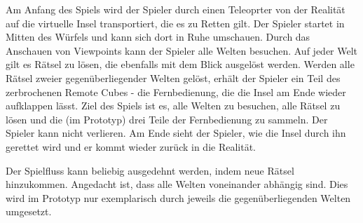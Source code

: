 
Am Anfang des Spiels wird der Spieler durch einen Teleoprter von der Realität auf die virtuelle Insel transportiert, die es zu Retten gilt. Der Spieler startet in Mitten des Würfels und kann sich dort in Ruhe umschauen. Durch das Anschauen von Viewpoints kann der Spieler alle Welten besuchen. Auf jeder Welt gilt es Rätsel zu lösen, die ebenfalls mit dem Blick ausgelöst werden. Werden alle Rätsel zweier gegenüberliegender Welten gelöst, erhält der Spieler ein Teil des zerbrochenen Remote Cubes - die Fernbedienung, die die Insel am Ende wieder aufklappen lässt.
Ziel des Spiels ist es, alle Welten zu besuchen, alle Rätsel zu lösen und die (im Prototyp) drei Teile der Fernbedienung zu sammeln. 
Der Spieler kann nicht verlieren. Am Ende sieht der Spieler, wie die Insel durch ihn gerettet wird und er kommt wieder zurück in die Realität.

Der Spielfluss kann beliebig ausgedehnt werden, indem neue Rätsel hinzukommen. Angedacht ist, dass alle Welten voneinander abhängig sind. Dies wird im Prototyp nur exemplarisch durch jeweils die gegenüberliegenden Welten umgesetzt.
